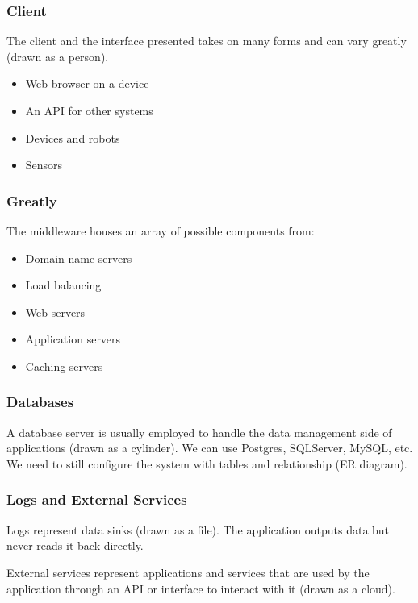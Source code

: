 \subsubsection{Client}\label{ssub:clinet_was}

The client and the interface presented takes on many forms and can vary greatly (drawn as a person).
\begin{itemize}
    \item Web browser on a device
    \item An API for other systems
    \item Devices and robots
    \item Sensors
\end{itemize}

\subsubsection{Greatly}\label{ssub:greatly}

The middleware houses an array of possible components from:
\begin{itemize}
    \item Domain name servers
    \item Load balancing
    \item Web servers
    \item Application servers
    \item Caching servers
\end{itemize}

\subsubsection{Databases}\label{ssub:databases_was}

A database server is usually employed to handle the data management side of applications (drawn as a cylinder).
We can use Postgres, SQLServer, MySQL, etc.
We need to still configure the system with tables and relationship (ER diagram).

\subsubsection{Logs and External Services}\label{ssub:logs_and_external_services}

Logs represent data sinks (drawn as a file).
The application outputs data but never reads it back directly.

External services represent applications and services that are used by the application through an API or interface to interact with it (drawn as a cloud).

